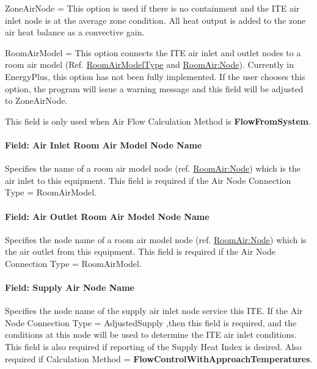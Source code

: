 ZoneAirNode = This option is used if there is no containment and the ITE air inlet node is at the average zone condition. All heat output is added to the zone air heat balance as a convective gain.

RoomAirModel = This option connects the ITE air inlet and outlet nodes to a room air model (Ref. \hyperref[roomairmodeltype]{RoomAirModelType} and \hyperref[roomairnode]{RoomAir:Node}).  Currently in EnergyPlus, this option has not been fully implemented.  If the user chooses this option, the program will issue a warning message and this field will be adjusted to ZoneAirNode.

This field is only used when Air Flow Calculation Method is \textbf{FlowFromSystem}.

\paragraph{Field: Air Inlet Room Air Model Node Name}\label{field-air-inlet-room-air-model-node-name}

Specifies the name of a room air model node (ref. \hyperref[roomairnode]{RoomAir:Node}) which is the air inlet to this equipment. This field is required if the Air Node Connection Type = RoomAirModel.

\paragraph{Field: Air Outlet Room Air Model Node Name}\label{field-air-outlet-room-air-model-node-name}

Specifies the node name of a room air model node (ref. \hyperref[roomairnode]{RoomAir:Node}) which is the air outlet from this equipment. This field is required if the Air Node Connection Type = RoomAirModel.

\paragraph{Field: Supply Air Node Name}\label{field-supply-air-node-name}

Specifies the node name of the supply air inlet node service this ITE. If the Air Node Connection Type = AdjustedSupply ,then this field is required, and the conditions at this node will be used to determine the ITE air inlet conditions. This field is also required if reporting of the Supply Heat Index is desired. Also required if Calculation Method = \textbf{FlowControlWithApproachTemperatures}.

